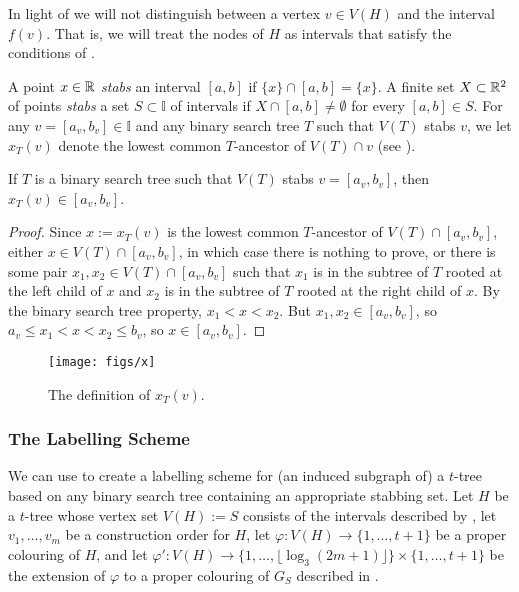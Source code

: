 \documentclass[kpfonts]{patmorin}
\let\le\leqslant
\begin{document}
In light of  we will not distinguish between a vertex $v\in V(H)$ and the interval $f(v)$.  That is, we will treat the nodes of $H$ as intervals that satisfy the conditions of .

A point $x\in\mathbb{R}$ \emph{stabs} an interval $[a,b]$ if $\{x\}\cap [a,b]=\{x\}$. A finite set $X\subset\mathbb{R}^2$ of points \emph{stabs} a set $S\subset\mathbb{I}$ of intervals if $X\cap [a,b]\neq\emptyset$ for every $[a,b]\in S$. For any $v=[a_v,b_v]\in\mathbb{I}$ and any binary search tree $T$ such that $V(T)$ stabs $v$, we let $x_T(v)$ denote the lowest common $T$-ancestor of $V(T)\cap v$ (see ).

\begin{lem}
If $T$ is a binary search tree such that $V(T)$ stabs $v=[a_v,b_v]$, then  $x_T(v)\in [a_v,b_v]$.
\end{lem}

\begin{proof}
  Since $x:=x_T(v)$ is the lowest common $T$-ancestor of $V(T)\cap[a_v,b_v]$, either $x\in V(T)\cap[a_v,b_v]$, in which case there is nothing to prove, or there is some pair $x_1,x_2\in V(T)\cap[a_v,b_v]$ such that $x_1$ is in the subtree of $T$ rooted at the left child of $x$ and $x_2$ is in the subtree of $T$ rooted at the right child of $x$.  By the binary search tree property, $x_1<x<x_2$. But $x_1,x_2 \in [a_v,b_v]$, so $a_v\le x_1<x<x_2\le b_v$, so $x\in [a_v,b_v]$.
\end{proof}


\begin{figure}
  \begin{center}
    \texttt{[image: figs/x]}
  \end{center}
  \caption{The definition of $x_T(v)$.}
\end{figure}


\subsubsection{The Labelling Scheme}

We can use  to create a labelling scheme for (an induced subgraph of) a $t$-tree based on any binary search tree containing an appropriate stabbing set.  Let $H$ be a $t$-tree whose vertex set $V(H):=S$ consists of the intervals described by , let $v_1,\ldots,v_m$ be a construction order for $H$, let $\varphi:V(H)\to\{1,\ldots,t+1\}$ be a proper colouring of $H$, and let $\varphi':V(H)\to\{1,\ldots,\lfloor\log_3 (2m+1)\rfloor\}\times\{1,\ldots,t+1\}$ be the extension of $\varphi$ to a proper colouring of $G_S$ described in .
\end{document}
